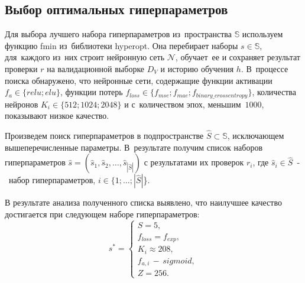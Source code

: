 \subsection{Выбор оптимальных гиперпараметров}\label{subsec:opt_hyper}

Для выбора лучшего набора гиперпараметров из~пространства $\mathbb{S}$ используем функцию fmin\cite[раздел FMin]{bib:hyperopt} из~библиотеки hyperopt.
Она перебирает наборы $s \in \mathbb{S}$, для~каждого из~них строит нейронную сеть $\mathcal{N}$, обучает~ее
и сохраняет результат проверки $r$ на валидационной выборке $D_V$ и историю\cite[раздел callbacks]{bib:keras} обучения $h$.
В~процессе поиска обнаружено, что нейронные сети, содержащие функции активации  $f_a \in \{relu; elu\}$, функции потерь $f_{loss} \in \{f_{mse}; f_{mae}; f_{binary\_crossentropy}\}$, количества нейронов $K_i \in \{512; 1024; 2048\}$ и с~количеством эпох, меньшим~$1000$, показывают низкое качество.

Произведем поиск гиперпараметров в подпространстве $\hat{S} \subset \mathbb{S}$, исключающем вышеперечисленные параметры.
В~результате получим список наборов гиперпараметров $\widehat{s} = (\widehat{s}_1, \widehat{s}_2, \dots, \widehat{s}_{|\hat{S}|})$ с результатами их проверок $r_i$,
где $\widehat{s}_i \in \hat{S}$~-~набор гиперпараметров, $i \in \{1; \dots; |\hat{S}|$\}.

В результате анализа полученного списка выявлено, что наилучшее качество достигается при следующем наборе гиперпараметров:
\begin{equation}\label{eq:hyper_set}
    s^* =
    \begin{cases}
        S = 5, \\
        f_{loss} = f_{exp}, \\
        K_i \approx 208, \\
        f_{a,i}\,-\, sigmoid,\\
        Z = 256.
    \end{cases}
\end{equation}


\newpage 